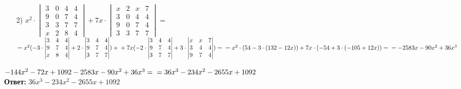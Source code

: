 \documentclass[a4paper]{article}
\begin{document}
\begin{enumerate}
\begin{enumerate}
        \item[2)]$x^2 \cdot  \begin{vmatrix} 3 & 0 & 4 & 4 \\ 9 & 0 & 7 & 4 \\ 3 & 3 & 7 & 7 \\ x & 2 & 8 & 4 \end{vmatrix} +7x \cdot \begin{vmatrix} x & 2 & x & 7 \\ 3 & 0 & 4 & 4 \\ 9 & 0 & 7 & 4 \\ 3 & 3 & 7 & 7 \end{vmatrix} = $\\
        $= x^2(-3 \cdot \begin{vmatrix}
            3 & 4 & 4 \\
            9 & 7 & 4 \\
            x & 8 & 4
            \end{vmatrix} + 2 \cdot \begin{vmatrix}
            3 & 4 & 4 \\
            9 & 7 & 4 \\
            3 & 7 & 7
            \end{vmatrix})+ \\ + 7 x  (-2 \cdot \begin{vmatrix}
            3 & 4 & 4 \\
            9 & 7 & 4 \\
            3 & 7 & 7
            \end{vmatrix} + 3 \cdot \begin{vmatrix}
            x & x & 7 \\
            3 & 4 & 4 \\
            9 & 7 & 4
            \end{vmatrix}) =\\
            = x^2 \cdot (54 - 3 \cdot (132 - 12x)) + 7x \cdot (-54 + 3 \cdot (-105 + 12x)) = \\
            = -2583x - 90x^2 + 36x^3$
    \end{enumerate}
    $-144x^2-72x+1092 -2583x - 90x^2 + 36x^3 =\\= 36x^3-234x^2-2655x+1092$\\
    \textbf{Ответ: } $36x^3-234x^2-2655x+1092$\\


\end{enumerate}
\end{document}
